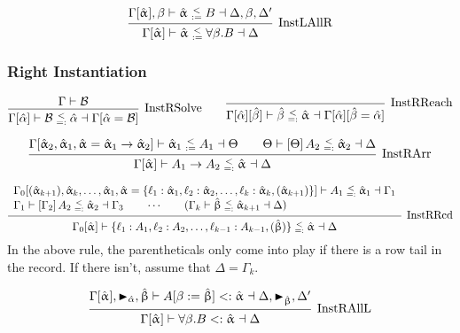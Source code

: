\documentclass{article}
\newcommand{\spc}{\qquad}
\newcommand{\lbl}{\ell}
\newcommand{\marker}[1]{\RHD_{#1}}
\newcommand{\ev}{\hat}
\newcommand{\evar}[1][]{\ev \upalpha_{#1}}
\newcommand{\evaralt}{\ev \upbeta}
\newcommand{\ctxinout}[3]{#1 \vdash #2 \dashv #3}
\newcommand{\subsume}{<:}
\newcommand{\subsumes}[4]{\ctxinout {#1} {#2 \subsume #3} {#4}}
\newcommand{\B}{\mathcal{B}}
\newcommand{\instLSymbol}{\;\substack{<\\:=}\;}
\newcommand{\instRSymbol}{\;\substack{<\\=:}\;}
\newcommand{\apply}[1]{\left[#1\right]}
\newcommand{\instL}[4]{#1 \vdash #2 \instLSymbol #3 \dashv #4}
\newcommand{\instR}[4]{#1 \vdash #2 \instRSymbol #3 \dashv #4}
\newcommand{\deduct}[3][]
{
  \begin{prooftree}
    \hypo{#2}
    \infer1[\text{#1}]{#3}
  \end{prooftree}
}
\begin{document}
\[
  \deduct[InstLAllR]
  { \instL{\Gamma[\evar], \beta}{\evar}{B}{\Delta, \beta, \Delta'} }
  { \instL{\Gamma[\evar]}{\evar}{\forall \beta. B}{\Delta} }
\]

\subsubsection{Right Instantiation}

\[
  \deduct[InstRSolve]
  {\Gamma \vdash \B}
  {\instR{\Gamma[\ev\alpha]}{\B}{\ev \alpha}{\Gamma[\ev\alpha = \B]}}
  \spc
  \deduct[InstRReach]
  {}
  {\instR{\Gamma[\ev\alpha][\ev\beta]}{\ev
      \beta}{\evar}{\Gamma[\ev\alpha][\ev\beta = \ev\alpha]}}
\]

\[
  \deduct[InstRArr] {\instL{\Gamma[\evar[2], \evar[1], \evar = \evar[1] \to
      \evar[2]]}{\evar[1]}{A_1}{\Theta} \spc \instR{\Theta}{\apply \Theta
      A_2}{\evar[2]}{\Delta} } {\instR{\Gamma[\evar]}{A_1 \to A_2}{\evar}{\Delta}}
\]

\[
  \deduct[InstRRcd]
  {
    \begin{array}{l}
     \instR{\Gamma_0[(\evar[k+1]), \evar[k], \dots, \evar[1], \evar=\{\lbl_1 : \evar[1],
      \lbl_2 : \evar[2], \dots, \lbl_k : \evar[k], (\evar[k+1])\}]}{A_1}{\evar[1]}{\Gamma_1} \\
    \instR{\Gamma_1}{\apply{\Gamma_2} A_2}{\evar[2]}{\Gamma_3} \spc \cdots \spc
     (\instR{\Gamma_k}{\evaralt}{\evar[k+1]}{\Delta})
  \end{array}
  }
  {\instR{\Gamma_0[\evar]}{\{\lbl_1:A_1, \lbl_2 : A_2, \dots, \lbl_{k-1} : A_{k-1}, (\evaralt)\}}{\evar}{\Delta}}
\]
In the above rule, the parentheticals only come into play if there is a row tail
in the record. If there isn't, assume that \(\Delta = \Gamma_k\).

\[
  \deduct[InstRAllL]
  { \subsumes{\Gamma[\evar], \marker{\ev\alpha}, \evaralt}{A[\beta := \evaralt]}{\evar}{\Delta, \marker{\evaralt}, \Delta'} }
  { \subsumes{\Gamma[\evar]}{\forall \beta. B}{\evar}{\Delta} }
\]
\end{document}
